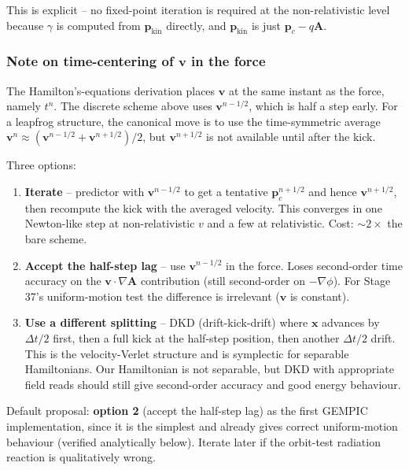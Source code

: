 \documentclass[11pt,a4paper]{article}
\newcommand{\vv}[1]{\mathbf{#1}}
\begin{document}
This is explicit -- no fixed-point iteration is required at the
non-relativistic level because $\gamma$ is computed from
$\vv{p}_{\mathrm{kin}}$ directly, and $\vv{p}_{\mathrm{kin}}$ is
just $\vv{p}_c - q\vv{A}$.

\subsubsection*{Note on time-centering of $\vv{v}$ in the force}

The Hamilton's-equations derivation places $\vv{v}$ at the same
instant as the force, namely $t^n$.  The discrete scheme above uses
$\vv{v}^{n-1/2}$, which is half a step early.  For a leapfrog
structure, the canonical move is to use the time-symmetric average
$\vv{v}^n \approx (\vv{v}^{n-1/2} + \vv{v}^{n+1/2})/2$, but
$\vv{v}^{n+1/2}$ is not available until after the kick.

Three options:
\begin{enumerate}
  \item \textbf{Iterate} -- predictor with $\vv{v}^{n-1/2}$ to get
    a tentative $\vv{p}_c^{n+1/2}$ and hence $\vv{v}^{n+1/2}$,
    then recompute the kick with the averaged velocity.  This
    converges in one Newton-like step at non-relativistic $v$
    and a few at relativistic.  Cost: $\sim 2\times$ the bare
    scheme.
  \item \textbf{Accept the half-step lag} -- use $\vv{v}^{n-1/2}$
    in the force.  Loses second-order time accuracy on the
    $\vv{v}\cdot\nabla\vv{A}$ contribution (still
    second-order on $-\nabla\phi$).  For Stage 37's uniform-motion
    test the difference is irrelevant ($\vv{v}$ is constant).
  \item \textbf{Use a different splitting} -- DKD (drift-kick-drift)
    where $\vv{x}$ advances by $\Delta t/2$ first, then a full
    kick at the half-step position, then another $\Delta t/2$
    drift.  This is the velocity-Verlet structure and is
    symplectic for separable Hamiltonians.  Our Hamiltonian is
    not separable, but DKD with appropriate field reads should
    still give second-order accuracy and good energy behaviour.
\end{enumerate}

Default proposal: \textbf{option 2} (accept the half-step lag) as
the first GEMPIC implementation, since it is the simplest and
already gives correct uniform-motion behaviour (verified
analytically below).  Iterate later if the orbit-test radiation
reaction is qualitatively wrong.
\end{document}
